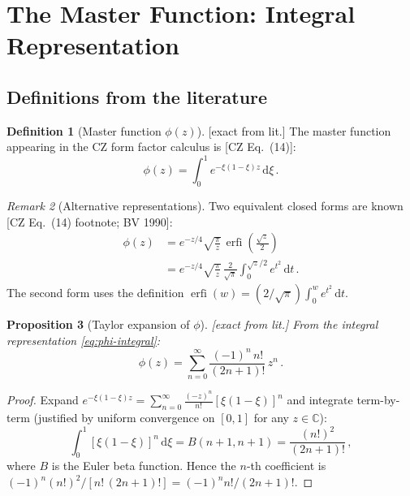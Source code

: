 \documentclass[12pt,a4paper]{article}
\newtheorem{proposition}{Proposition}[section]
\theoremstyle{definition}
\newtheorem{definition}[proposition]{Definition}
\theoremstyle{remark}
\newtheorem{remark}[proposition]{Remark}
\newcommand{\dd}{\mathrm{d}}
\newcommand{\erfi}{\operatorname{erfi}}
\newcommand{\fromlit}[1]{\textcolor{blue!70!black}{\textsf{[#1]}}}
\newcommand{\exactlit}{\textcolor{blue!60!black}{\textsf{[exact from lit.]}}}
\begin{document}
\section{The Master Function: Integral Representation}
\label{sec:master-function}

\subsection{Definitions from the literature}

\begin{definition}[Master function $\phi(z)$]
\label{def:phi}
\exactlit\;
The master function appearing in the CZ form factor calculus is
\fromlit{CZ Eq.~(14)}:
\begin{equation}
  \phi(z) = \int_0^1 e^{-\xi(1-\xi)z}\,\dd\xi\,.
  \label{eq:phi-integral}
\end{equation}
\end{definition}

\begin{remark}[Alternative representations]
Two equivalent closed forms are known \fromlit{CZ Eq.~(14) footnote;
BV 1990}:
\begin{align}
  \phi(z) &= e^{-z/4}\sqrt{\frac{\pi}{z}}\,\erfi\!\left(
    \frac{\sqrt{z}}{2}\right)
    \label{eq:phi-erfi}\\
  &= e^{-z/4}\sqrt{\frac{\pi}{z}}\,\frac{2}{\sqrt{\pi}}
    \int_0^{\sqrt{z}/2} e^{t^2}\,\dd t\,.
    \label{eq:phi-dawson}
\end{align}
The second form uses the definition $\erfi(w) =
(2/\sqrt{\pi})\int_0^w e^{t^2}\,\dd t$.
\end{remark}

\begin{proposition}[Taylor expansion of $\phi$]
\label{prop:phi-taylor}
\exactlit\;
From the integral representation \eqref{eq:phi-integral}:
\begin{equation}
  \phi(z) = \sum_{n=0}^{\infty} \frac{(-1)^n\, n!}{(2n+1)!}\, z^n\,.
  \label{eq:phi-taylor}
\end{equation}
\end{proposition}
\begin{proof}
Expand $e^{-\xi(1-\xi)z} = \sum_{n=0}^\infty \frac{(-z)^n}{n!}
[\xi(1-\xi)]^n$ and integrate term-by-term (justified by
uniform convergence on $[0,1]$ for any $z\in\mathbb{C}$):
\begin{equation}
  \int_0^1 [\xi(1-\xi)]^n\,\dd\xi = B(n+1,n+1)
  = \frac{(n!)^2}{(2n+1)!}\,,
\end{equation}
where $B$ is the Euler beta function.  Hence the $n$-th coefficient is
$(-1)^n (n!)^2 / [n!\,(2n+1)!] = (-1)^n n!/(2n+1)!$.
\end{proof}
\end{document}
